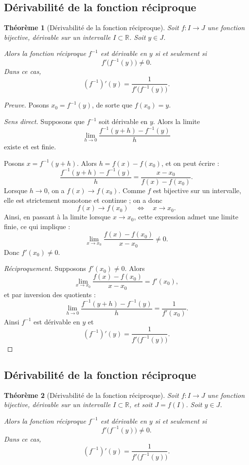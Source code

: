 \documentclass{report} %
\theoremstyle{definition}  %
\theoremstyle{plain} %
\newtheorem{theorem}{Théorème}[chapter]
\theoremstyle{remark} %
\begin{document}
\medskip

\subsection{Dérivabilité de la fonction réciproque}

\begin{theorem}[Dérivabilité de la fonction réciproque]
Soit \(f : I \to J\) une fonction bijective, dérivable sur un intervalle \(I \subset \mathbb{R}\).
Soit \(y \in J\).  

Alors la fonction réciproque \(f^{-1}\) est dérivable en \(y\) si et seulement si
\[
f'\big(f^{-1}(y)\big) \neq 0.
\]
Dans ce cas,
\[
(f^{-1})'(y) = \frac{1}{f'\big(f^{-1}(y)\big)}.
\]
\end{theorem}

\medskip

\begin{proof}[Preuve]
Posons \(x_0 = f^{-1}(y)\), de sorte que \(f(x_0) = y\).

\medskip
\emph{Sens direct.}  
Supposons que \(f^{-1}\) soit dérivable en \(y\).  
Alors la limite
\[
\lim_{h \to 0} \frac{f^{-1}(y+h) - f^{-1}(y)}{h}
\]
existe et est finie.

Posons \(x = f^{-1}(y+h)\). Alors \(h = f(x) - f(x_0)\), et on peut écrire :
\[
\frac{f^{-1}(y+h) - f^{-1}(y)}{h}
=
\frac{x - x_0}{f(x) - f(x_0)}.
\]
Lorsque \( h \to 0 \), on a \( f(x) \to f(x_0) \).
Comme \( f \) est bijective sur un intervalle, elle est strictement monotone
et continue ; on a donc
\[
f(x) \to f(x_0) \quad \Longleftrightarrow \quad x \to x_0.
\]
Ainsi, en passant à la limite lorsque \(x \to x_0\), cette expression admet une limite finie, ce qui implique :
\[
\lim_{x \to x_0} \frac{f(x) - f(x_0)}{x - x_0} \neq 0.
\]
Donc \(f'(x_0) \neq 0\).

\medskip
\emph{Réciproquement.}  
Supposons \(f'(x_0) \neq 0\).  
Alors
\[
\lim_{x \to x_0} \frac{f(x) - f(x_0)}{x - x_0} = f'(x_0),
\]
et par inversion des quotients :
\[
\lim_{h \to 0} \frac{f^{-1}(y+h) - f^{-1}(y)}{h}
=
\frac{1}{f'(x_0)}.
\]
Ainsi \(f^{-1}\) est dérivable en \(y\) et
\[
(f^{-1})'(y) = \frac{1}{f'\big(f^{-1}(y)\big)}.
\]
\end{proof}

\medskip
\subsection{Dérivabilité de la fonction réciproque}

\begin{theorem}[Dérivabilité de la fonction réciproque]
Soit \( f : I \to J \) une fonction bijective, dérivable sur un intervalle
\( I \subset \mathbb{R} \), et soit \( J = f(I) \).
Soit \( y \in J \).

Alors la fonction réciproque \( f^{-1} \) est dérivable en \( y \) si et seulement si
\[
f'\bigl(f^{-1}(y)\bigr) \neq 0.
\]
Dans ce cas,
\[
(f^{-1})'(y) = \frac{1}{f'\bigl(f^{-1}(y)\bigr)}.
\]
\end{theorem}
\end{document}
